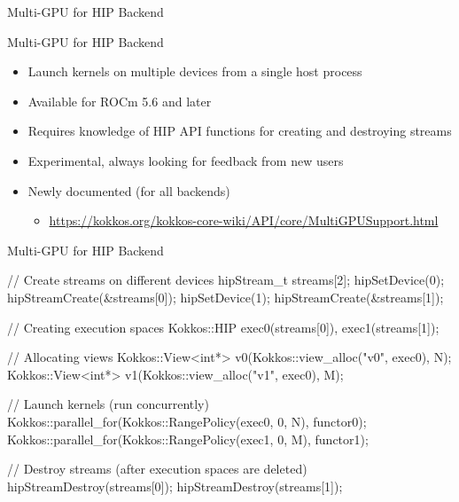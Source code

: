 \begin{frame}[fragile]\label{sec:new_features}

  {\Huge Multi-GPU for HIP Backend}

  \vspace{10pt}

\end{frame}

\begin{frame}[fragile]{Multi-GPU for HIP Backend}
  \begin{itemize}
    \item Launch kernels on multiple devices from a single host process
    \item Available for ROCm 5.6 and later
    \item Requires knowledge of HIP API functions for creating and destroying streams
    \item Experimental, always looking for feedback from new users
    \item Newly documented (for all backends)  
      \begin{itemize} 
        \item[] \url{https://kokkos.org/kokkos-core-wiki/API/core/MultiGPUSupport.html}
      \end{itemize}
  \end{itemize}
\end{frame}

\begin{frame}[fragile]{Multi-GPU for HIP Backend}
  \begin{code}[keywords={auto}]
// Create streams on different devices
hipStream_t streams[2];
hipSetDevice(0); hipStreamCreate(&streams[0]);
hipSetDevice(1); hipStreamCreate(&streams[1]);
{
  // Creating execution spaces 
  Kokkos::HIP exec0(streams[0]), exec1(streams[1]);

  // Allocating views
  Kokkos::View<int*> v0(Kokkos::view_alloc("v0", exec0), N);
  Kokkos::View<int*> v1(Kokkos::view_alloc("v1", exec0), M);

  // Launch kernels (run concurrently)
  Kokkos::parallel_for(Kokkos::RangePolicy(exec0, 0, N), functor0);
  Kokkos::parallel_for(Kokkos::RangePolicy(exec1, 0, M), functor1);
}
// Destroy streams (after execution spaces are deleted)
hipStreamDestroy(streams[0]); hipStreamDestroy(streams[1]);
  \end{code}
\end{frame}

